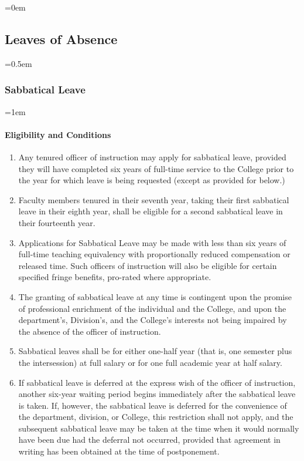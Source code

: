 \documentclass{manual}
\let\oldsubsection\subsection
\renewcommand\subsection{\leftskip=0em\oldsubsection}
\let\oldsubsubsection\subsubsection
\renewcommand\subsubsection{\leftskip=0.5em\oldsubsubsection}
\let\oldparagraph\paragraph
\renewcommand\paragraph{\leftskip=1em\oldparagraph}
\newcommand{\itemLevelA}{\alph*.}
\newcommand{\itemRefA}{\alph*}
\begin{document}
\subsection{Leaves of Absence}\label{sec:LeavesOfAbsence}

\subsubsection{Sabbatical Leave}

\paragraph{Eligibility and Conditions}
\begin{enumerate}[label=\itemLevelA,ref=\itemRefA]

\item Any tenured officer of instruction may apply for sabbatical leave, provided they will have completed six years of full-time service to the College prior to the year for which leave is being requested (except as provided for below.)

\item Faculty members tenured in their seventh year, taking their first sabbatical leave in their eighth year, shall be eligible for a second sabbatical leave in their fourteenth year.

\item Applications for Sabbatical Leave may be made with less than six years of full-time teaching equivalency with proportionally reduced compensation or released time. Such officers of instruction will also be eligible for certain specified fringe benefits, pro-rated where appropriate.

\item The granting of sabbatical leave at any time is contingent upon the promise of professional enrichment of the individual and the College, and upon the department's, Division's, and the College's interests not being impaired by the absence of the officer of instruction.

\item Sabbatical leaves shall be for either one-half year (that is, one semester plus the intersession) at full salary or for one full academic year at half salary.

\item If sabbatical leave is deferred at the express wish of the officer of instruction, another six-year waiting period begins immediately after the sabbatical leave is taken. If, however, the sabbatical leave is deferred for the convenience of the department, division, or College, this restriction shall not apply, and the subsequent sabbatical leave may be taken at the time when it would normally have been due had the deferral not occurred, provided that agreement in writing has been obtained at the time of postponement.
\end{enumerate}
\end{document}
